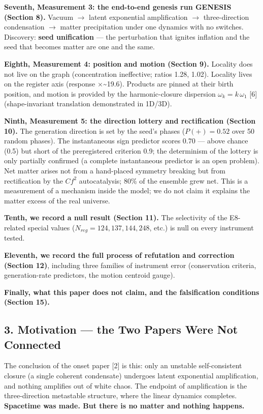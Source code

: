 \documentclass[
  a4paper,
]{article}
\begin{document}
\textbf{Seventh, Measurement 3: the end-to-end genesis run GENESIS
(Section 8).} Vacuum \(\to\) latent exponential amplification \(\to\)
three-direction condensation \(\to\) matter precipitation under one
dynamics with no switches. Discovery: \textbf{seed unification} --- the
perturbation that ignites inflation and the seed that becomes matter are
one and the same.

\textbf{Eighth, Measurement 4: position and motion (Section 9).}
Locality does not live on the graph (concentration ineffective; ratios
1.28, 1.02). Locality lives on the register axis (response
\(\times\)\textasciitilde19.6). Products are pinned at their birth
position, and motion is provided by the harmonic-closure dispersion
\(\omega_k=k\,\omega_1\) {[}6{]} (shape-invariant translation
demonstrated in 1D/3D).

\textbf{Ninth, Measurement 5: the direction lottery and rectification
(Section 10).} The generation direction is set by the seed's phases
(\(P(+)=0.52\) over 50 random phases). The instantaneous sign predictor
scores 0.70 --- above chance (0.5) but short of the preregistered
criterion 0.9; the determinism of the lottery is only partially
confirmed (a complete instantaneous predictor is an open problem). Net
matter arises not from a hand-placed symmetry breaking but from
rectification by the \(Cf^2\) autocatalysis; 80\% of the ensemble grew
net. This is a measurement of a mechanism inside the model; we do not
claim it explains the matter excess of the real universe.

\textbf{Tenth, we record a null result (Section 11).} The selectivity of
the E8-related special values (\(N_{reg}=124,137,144,248\), etc.) is
null on every instrument tested.

\textbf{Eleventh, we record the full process of refutation and
correction (Section 12)}, including three families of instrument error
(conservation criteria, generation-rate predictors, the motion centroid
gauge).

\textbf{Finally, what this paper does not claim, and the falsification
conditions (Section 15).}

\subsection{3. Motivation --- the Two Papers Were Not
Connected}\label{motivation-the-two-papers-were-not-connected}

The conclusion of the onset paper {[}2{]} is this: only an unstable
self-consistent closure (a single coherent condensate) undergoes latent
exponential amplification, and nothing amplifies out of white chaos. The
endpoint of amplification is the three-direction metastable structure,
where the linear dynamics completes. \textbf{Spacetime was made. But
there is no matter and nothing happens.}
\end{document}
